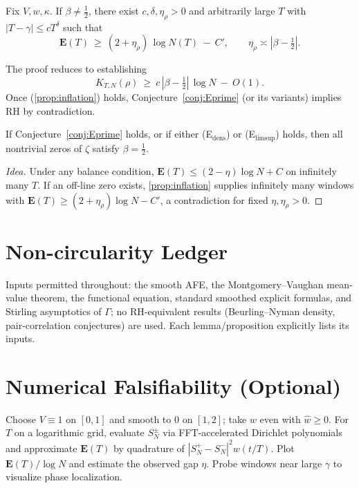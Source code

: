\documentclass[11pt]{article}
\newcommand{\EE}{\mathbf{E}}
\newcommand{\abs}[1]{\left\lvert #1 \right\rvert}
\newcommand{\widehatw}{\widehat{w}}
\newcommand{\zetaR}{\zeta}
\begin{document}
\begin{proposition}\label{prop:inflation}
Fix $V,w,\kappa$. If $\beta\neq\tfrac12$, there exist $c,\delta,\eta_\rho>0$ and arbitrarily large $T$ with $\abs{T-\gamma}\le c T^\delta$ such that
\begin{equation}
\EE(T)\ \ge\ (2+\eta_\rho)\,\log N(T)\ -\ C',\qquad \eta_\rho\asymp \abs{\beta-\tfrac12}.
\tag{4.1}
\end{equation}
\end{proposition}
The proof reduces to establishing
\begin{equation}
\boxed{\quad K_{T,N}(\rho)\ \ge\ c\,\abs{\beta-\tfrac12}\,\log N\ -\ O(1).\quad}
\tag{3.4}
\end{equation}
Once (\ref{prop:inflation}) holds, Conjecture~\ref{conj:Eprime} (or its variants) implies RH by contradiction.

\begin{theorem}\label{thm:EtoRH}
If Conjecture~\ref{conj:Eprime} holds, or if either (E$_\mathrm{dens}$) or (E$_\mathrm{limsup}$) holds, then all nontrivial zeros of $\zetaR$ satisfy $\beta=\tfrac12$.
\end{theorem}
\begin{proof}[Idea]
Under any balance condition, $\EE(T)\le (2-\eta)\log N +C$ on infinitely many $T$. If an off-line zero exists, \cref{prop:inflation} supplies infinitely many windows with $\EE(T)\ge (2+\eta_\rho)\log N -C'$, a contradiction for fixed $\eta,\eta_\rho>0$.
\end{proof}

\section{Non-circularity Ledger}
Inputs permitted throughout: the smooth AFE, the Montgomery--Vaughan mean-value theorem, the functional equation, standard smoothed explicit formulas, and Stirling asymptotics of $\Gamma$; no RH-equivalent results (Beurling--Nyman density, pair-correlation conjectures) are used. Each lemma/proposition explicitly lists its inputs.

\section{Numerical Falsifiability (Optional)}
Choose $V\equiv1$ on $[0,1]$ and smooth to 0 on $[1,2]$; take $w$ even with $\widehatw\ge0$. For $T$ on a logarithmic grid, evaluate $S_N^\pm$ via FFT-accelerated Dirichlet polynomials and approximate $\EE(T)$ by quadrature of $\abs{S_N^+-S_N^-}^2 w(t/T)$. Plot $\EE(T)/\log N$ and estimate the observed gap $\eta$. Probe windows near large $\gamma$ to visualize phase localization.
\end{document}
